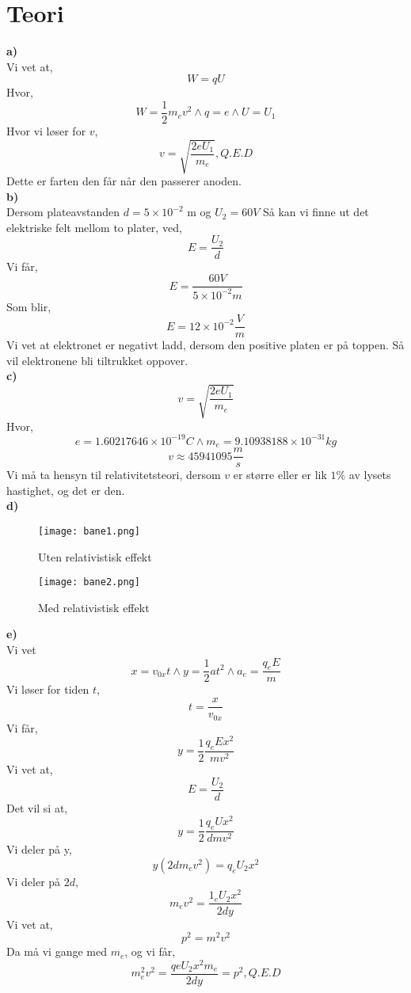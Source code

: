 \documentclass[a4paper]{article}
\begin{document}
\section{Teori} %
\label{sec:teori}
\textbf{a)} \\
Vi vet at,
\[
W = qU
\]
Hvor,
\[
W = \frac{1}{2}m_ev^2 \wedge q = e \wedge U = U_1
\]
Hvor vi løser for $v$,
\[
v = \sqrt{\frac{2eU_1}{m_e}}, Q.E.D
\]
Dette er farten den får når den passerer anoden. \\
\textbf{b)} \\
Dersom plateavstanden $d = 5 \times 10^{-2}$ m og  $U_2 = 60 V$
Så kan vi finne ut det elektriske felt mellom to plater, ved,
\[
E = \frac{U_2}{d}
\]
Vi får,
\[
	E = \frac{60V}{5 \times 10^{-2} m} 
\]
Som blir,
\[
	E = 12 \times 10^{-2} \frac{V}{m}
\]
Vi vet at elektronet er negativt ladd, dersom den positive platen er på toppen. Så vil elektronene bli tiltrukket oppover. \\
\textbf{c)} \\
\[
	v = \sqrt{\frac{2eU_1}{m_e}} 
\]
Hvor,
\[
e = 1.60217646 \times 10^{-19}C \wedge m_e = 9.10938188 \times 10^{-31}kg
\]
\[
v \approx 45941095 \frac{m}{s} 
\]
Vi må ta hensyn til relativitetsteori, dersom $v$ er større eller er lik $1\%$ av lysets hastighet, og det er den. \\
\textbf{d)} \\

\begin{figure}[h]
  \centering
  \texttt{[image: bane1.png]}
  \caption{Uten relativistisk effekt}
  \label{fig:bane1.png} 
\end{figure}

\begin{figure}[h]
  \centering
  \texttt{[image: bane2.png]}
  \caption{Med relativistisk effekt}
  \label{fig:bane2.png} 
\end{figure}

\textbf{e)} \\
Vi vet
\[
	x = v_{0x}t \wedge y = \frac{1}{2}at^2 \wedge a_e = \frac{q_eE}{m}
\]
Vi løser for tiden $t$,
\[
	t = \frac{x}{v_{0x}}
\]
Vi får,
\[
y = \frac{1}{2}\frac{q_eEx^2}{mv^2}
\]
Vi vet at,
\[
E = \frac{U_2}{d}
\]
Det vil si at,
\[
y = \frac{1}{2}\frac{q_eUx^2}{dmv^2}
\]
Vi deler på y,
\[
y(2dm_ev^2) = q_eU_2x^2
\]
Vi deler på $2d$,
\[
m_ev^2 = \frac{1_eU_2x^2}{2dy}
\]
Vi vet at,
\[
p^2 = m^2v^2
\]
Da må vi gange med $m_e$, og vi får,
 \[
m_e^2v^2 = \frac{qeU_2x^2m_e}{2dy} = p^2, Q.E.D
\]
\end{document}
